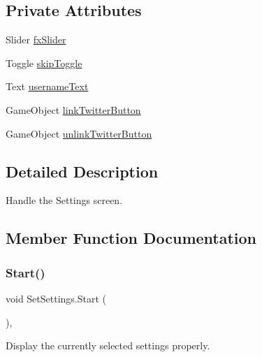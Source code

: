 \subsection*{Private Attributes}
\begin{DoxyCompactItemize}
\item 
Slider \mbox{\hyperlink{class_set_settings_a22abfb2631badd1928606e7a15dbe310}{fx\+Slider}}
\item 
Toggle \mbox{\hyperlink{class_set_settings_a8d84aee5172cd4bc5ee79c4e3ed5b074}{skip\+Toggle}}
\item 
Text \mbox{\hyperlink{class_set_settings_a153bac85520244c29722c46cd76eda14}{username\+Text}}
\item 
Game\+Object \mbox{\hyperlink{class_set_settings_afedeb5ec6b9f344ada1f0cb254baffa2}{link\+Twitter\+Button}}
\item 
Game\+Object \mbox{\hyperlink{class_set_settings_a2b44bdf91cd96346c509f960a569f366}{unlink\+Twitter\+Button}}
\end{DoxyCompactItemize}


\subsection{Detailed Description}
Handle the Settings screen. 

\subsection{Member Function Documentation}
\mbox{\label{class_set_settings_a7d405e56dc6123768fac6fdd6e70ab0f}} 
\subsubsection{\texorpdfstring{Start()}{Start()}}
{\footnotesize\ttfamily void Set\+Settings.\+Start (\begin{DoxyParamCaption}{ }\end{DoxyParamCaption})\hspace{0.3cm}{\ttfamily [inline]}, {\ttfamily [private]}}



Display the currently selected settings properly. 

\mbox{\label{class_set_settings_a73e6df43190f0b5494a4b66328fa9d12}} 
